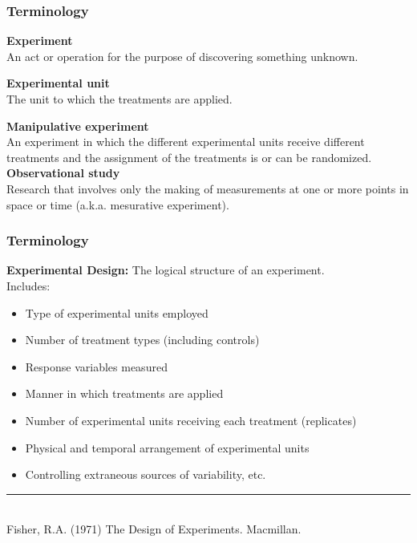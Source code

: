 \documentclass[color=usenames,dvipsnames]{beamer}\usepackage[]{graphicx}\usepackage[]{color}
\begin{document}
\begin{frame}
  \frametitle{Terminology} 
  {\bf Experiment} \\
  An act or operation for the purpose of discovering something
  unknown. \par
  \pause
  \vspace{12pt}
  {\bf Experimental unit} \\
  The unit to which the treatments are applied. \par
  \pause
  \vspace{12pt}
  {\bf Manipulative experiment} \\
  An experiment in which the different experimental units receive
  different treatments and the assignment of the treatments is or can
  be randomized. \\
  \pause
  \vspace{12pt}
  {\bf Observational study} \\
  Research that involves only the making of measurements at one
  or more points in space or time (a.k.a. mesurative experiment). \par
\end{frame}




\begin{frame}
  \frametitle{Terminology}
  {\bf Experimental Design:} %
  The logical structure of an experiment. \\ %
  \vspace{6pt}
  \vfill  
  Includes:
  \begin{itemize}
    \item Type of experimental units employed
    \item Number of treatment types (including controls)
    \item Response variables measured
    \item Manner in which treatments are applied
    \item Number of experimental units receiving each treatment (replicates)
    \item Physical and temporal arrangement of experimental units
    \item Controlling extraneous sources of variability, etc.
  \end{itemize}
  \vfill
  \vspace{6pt}
  \rule[0mm]{1cm}{0.1mm} \\
  \footnotesize
  Fisher, R.A. (1971) The Design of Experiments. Macmillan. 
\end{frame}
\end{document}
